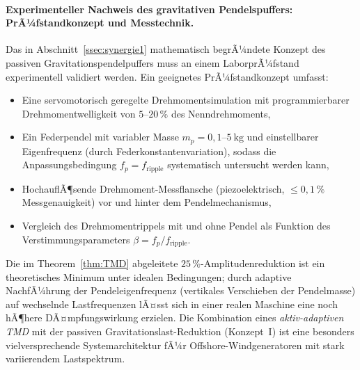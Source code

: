 ﻿\documentclass[12pt, a4paper]{report}
\theoremstyle{definition}
\theoremstyle{remark}
\begin{document}
\paragraph{Experimenteller Nachweis des gravitativen Pendelspuffers:
PrÃ¼fstandkonzept und Messtechnik.}
Das in Abschnitt~\ref{ssec:synergie1} mathematisch begrÃ¼ndete Konzept des
passiven Gravitationspendelpuffers muss an einem LaborprÃ¼fstand experimentell
validiert werden. Ein geeignetes PrÃ¼fstandkonzept umfasst:
\begin{itemize}
  \item Eine servomotorisch geregelte Drehmomentsimulation mit programmierbarer
        Drehmomentwelligkeit von $5$--$20\,\%$ des Nenndrehmoments,
  \item Ein Federpendel mit variabler Masse $m_p = 0{,}1$--$\SI{5}{\kilogram}$
        und einstellbarer Eigenfrequenz (durch Federkonstantenvariation), sodass
        die Anpassungsbedingung $f_p = f_{\text{ripple}}$ systematisch untersucht
        werden kann,
  \item HochauflÃ¶sende Drehmoment-Messflansche (piezoelektrisch,
        $\leq 0{,}1\,\%$ Messgenauigkeit) vor und hinter dem Pendelmechanismus,
  \item Vergleich des Drehmomentrippels mit und ohne Pendel als Funktion des
        Verstimmungsparameters $\beta = f_p / f_{\text{ripple}}$.
\end{itemize}
Die im Theorem~\ref{thm:TMD} abgeleitete $25\,\%$-Amplitudenreduktion ist ein
theoretisches Minimum unter idealen Bedingungen; durch adaptive NachfÃ¼hrung der
Pendeleigenfrequenz (vertikales Verschieben der Pendelmasse) auf wechselnde
Lastfrequenzen lÃ¤sst sich in einer realen Maschine eine noch hÃ¶here DÃ¤mpfungswirkung
erzielen. Die Kombination eines \emph{aktiv-adaptiven TMD} mit der passiven
Gravitationslast-Reduktion (Konzept~I) ist eine besonders vielversprechende
Systemarchitektur fÃ¼r Offshore-Windgeneratoren mit stark variierendem Lastspektrum.
\end{document}
